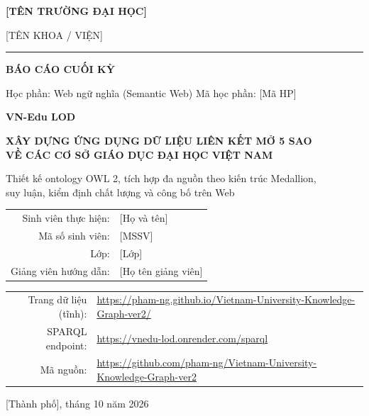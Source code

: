 \documentclass[12pt,a4paper]{article}
\begin{document}
\begin{titlepage}
\thispagestyle{empty}
\centering
{\large\bfseries [TÊN TRƯỜNG ĐẠI HỌC]\par}
{\large [TÊN KHOA / VIỆN]\par}
\vspace{0.3cm}\rule{0.55\textwidth}{0.4pt}\par
\vspace{2.2cm}
{\Large\bfseries BÁO CÁO CUỐI KỲ\par}
\vspace{0.3cm}
{\large Học phần: Web ngữ nghĩa (Semantic Web) \quad Mã học phần: [Mã HP]\par}
\vspace{1.6cm}
{\LARGE\bfseries VN-Edu LOD\par}
\vspace{0.4cm}
{\Large\bfseries XÂY DỰNG ỨNG DỤNG DỮ LIỆU LIÊN KẾT MỞ 5 SAO\\[3pt] VỀ CÁC CƠ SỞ GIÁO DỤC ĐẠI HỌC VIỆT NAM\par}
\vspace{0.5cm}
{\large Thiết kế ontology OWL 2, tích hợp đa nguồn theo kiến trúc Medallion,\\ suy luận, kiểm định chất lượng
và công bố trên Web\par}
\vspace{2.0cm}
\begin{tabular}{rl}
Sinh viên thực hiện: & [Họ và tên] \\
Mã số sinh viên:    & [MSSV] \\
Lớp:                & [Lớp] \\[6pt]
Giảng viên hướng dẫn: & [Họ tên giảng viên] \\
\end{tabular}
\vfill
{\small
\begin{tabular}{rl}
Trang dữ liệu (tĩnh): & \url{https://pham-ng.github.io/Vietnam-University-Knowledge-Graph-ver2/} \\
SPARQL endpoint:      & \url{https://vnedu-lod.onrender.com/sparql} \\
Mã nguồn:             & \url{https://github.com/pham-ng/Vietnam-University-Knowledge-Graph-ver2} \\
\end{tabular}}
\vspace{0.9cm}

{\large [Thành phố], tháng 10 năm 2026\par}
\end{titlepage}
\end{document}
